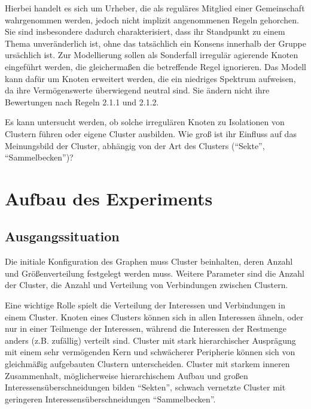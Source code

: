 \documentclass[11pt, a4paper]{scrartcl}
\begin{document}
Hierbei handelt es sich um Urheber, die als reguläres Mitglied einer Gemeinschaft  wahrgenommen werden, jedoch nicht implizit angenommenen Regeln gehorchen. Sie sind insbesondere dadurch charakterisiert, dass ihr Standpunkt zu einem Thema unveränderlich ist, ohne das tatsächlich ein Konsens innerhalb der Gruppe ursächlich ist. Zur Modellierung sollen als Sonderfall irregulär agierende Knoten eingeführt werden, die gleichermaßen die betreffende Regel ignorieren. Das Modell kann dafür um Knoten erweitert werden, die ein niedriges Spektrum aufweisen, da ihre Vermögenswerte überwiegend neutral sind. Sie ändern nicht ihre Bewertungen nach Regeln 2.1.1 und 2.1.2.

Es kann untersucht werden, ob solche irregulären Knoten zu Isolationen von Clustern führen oder eigene Cluster ausbilden. Wie groß ist ihr Einfluss auf das Meinungsbild der Cluster, abhängig von der Art des Clusters ("`Sekte"', "`Sammelbecken"')?


\section{Aufbau des Experiments}
\subsection{Ausgangssituation}
Die initiale Konfiguration des Graphen muss Cluster beinhalten, deren Anzahl und Größenverteilung festgelegt werden muss. Weitere Parameter sind die Anzahl der Cluster, die Anzahl und Verteilung von Verbindungen zwischen Clustern.

Eine wichtige Rolle spielt die Verteilung der Interessen und Verbindungen in einem Cluster. Knoten eines Clusters können sich in allen Interessen ähneln, oder nur in einer Teilmenge der Interessen, während die Interessen der Restmenge anders (z.B. zufällig) verteilt sind. Cluster mit stark hierarchischer Ausprägung mit einem sehr vermögenden Kern und schwächerer Peripherie können sich von gleichmäßig aufgebauten Clustern unterscheiden. Cluster mit starkem inneren Zusammenhalt, möglicherweise hierarchischem Aufbau und großen Interessensüberschneidungen bilden "`Sekten"', schwach vernetzte Cluster mit geringeren Interessensüberschneidungen "`Sammelbecken"'.
\end{document}
